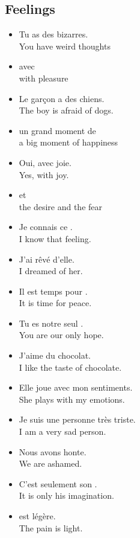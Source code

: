 \pagebreak
\subsection{Feelings}

\begin{itemize}
  \item  Tu as des  bizarres. \\ You have weird thoughts
	\item  avec  \\ with pleasure
	\item  Le gar{\c c}on a  des chiens. \\ The boy is afraid of dogs.
	\item  un grand moment de  \\ a big moment of happiness
	\item  Oui, avec joie. \\ Yes, with joy.
	\item  {} et  \\ the desire and the fear
	\item  Je connais ce . \\ I know that feeling.
	\item  J'ai r{\^e}v{\'e} d'elle. \\ I dreamed of her.
	\item  Il est temps pour . \\ It is time for peace.
	\item  Tu es notre seul . \\ You are our only hope.
	\item  J'aime  du chocolat. \\ I like the taste of chocolate.
	\item  Elle joue avec mon sentiments. \\ She plays with my emotions.
	\item  Je suis une personne tr{\`e}s triste. \\ I am a very sad person.
	\item  Nous avons honte. \\ We are ashamed.
	\item  C'est seulement son . \\ It is only his imagination.
	\item  {} est l{\'e}g{\`e}re. \\ The pain is light.

\end{itemize}
